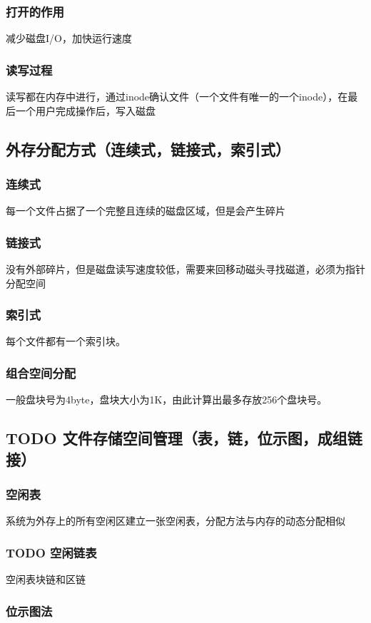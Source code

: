 \documentclass[11pt]{article}
\begin{document}
\subsubsection{打开的作用}
\label{sec-4-6-2}
减少磁盘I/O，加快运行速度
\subsubsection{读写过程}
\label{sec-4-6-3}
读写都在内存中进行，通过inode确认文件（一个文件有唯一的一个inode），在最后一个用户完成操作后，写入磁盘
\subsection{外存分配方式（连续式，链接式，索引式）}
\label{sec-4-7}
\subsubsection{连续式}
\label{sec-4-7-1}
每一个文件占据了一个完整且连续的磁盘区域，但是会产生碎片
\subsubsection{链接式}
\label{sec-4-7-2}
没有外部碎片，但是磁盘读写速度较低，需要来回移动磁头寻找磁道，必须为指针分配空间
\subsubsection{索引式}
\label{sec-4-7-3}
每个文件都有一个索引块。
\subsubsection{组合空间分配}
\label{sec-4-7-4}
一般盘块号为4byte，盘块大小为1K，由此计算出最多存放256个盘块号。
\subsection{{\bfseries\sffamily TODO} 文件存储空间管理（表，链，位示图，成组链接）}
\label{sec-4-8}
\subsubsection{空闲表}
\label{sec-4-8-1}
系统为外存上的所有空闲区建立一张空闲表，分配方法与内存的动态分配相似
\subsubsection{{\bfseries\sffamily TODO} 空闲链表}
\label{sec-4-8-2}
空闲表块链和区链
\subsubsection{位示图法}
\label{sec-4-8-3}
\end{document}
